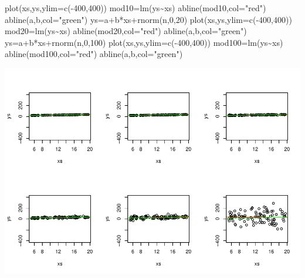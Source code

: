 \documentclass[
]{book}
\newenvironment{Shaded}{\begin{snugshade}}{\end{snugshade}}
\newcommand{\AttributeTok}[1]{\textcolor[rgb]{0.77,0.63,0.00}{#1}}
\newcommand{\DecValTok}[1]{\textcolor[rgb]{0.00,0.00,0.81}{#1}}
\newcommand{\FunctionTok}[1]{\textcolor[rgb]{0.00,0.00,0.00}{#1}}
\newcommand{\NormalTok}[1]{#1}
\newcommand{\OtherTok}[1]{\textcolor[rgb]{0.56,0.35,0.01}{#1}}
\newcommand{\SpecialCharTok}[1]{\textcolor[rgb]{0.00,0.00,0.00}{#1}}
\newcommand{\StringTok}[1]{\textcolor[rgb]{0.31,0.60,0.02}{#1}}
\begin{document}
\begin{Shaded}
\begin{Highlighting}[]
\FunctionTok{plot}\NormalTok{(xs,ys,}\AttributeTok{ylim=}\FunctionTok{c}\NormalTok{(}\SpecialCharTok{{-}}\DecValTok{400}\NormalTok{,}\DecValTok{400}\NormalTok{))}
\NormalTok{mod10}\OtherTok{=}\FunctionTok{lm}\NormalTok{(ys}\SpecialCharTok{\textasciitilde{}}\NormalTok{xs)}
\FunctionTok{abline}\NormalTok{(mod10,}\AttributeTok{col=}\StringTok{"red"}\NormalTok{)}
\FunctionTok{abline}\NormalTok{(a,b,}\AttributeTok{col=}\StringTok{"green"}\NormalTok{)}
\NormalTok{ys}\OtherTok{=}\NormalTok{a}\SpecialCharTok{+}\NormalTok{b}\SpecialCharTok{*}\NormalTok{xs}\SpecialCharTok{+}\FunctionTok{rnorm}\NormalTok{(n,}\DecValTok{0}\NormalTok{,}\DecValTok{20}\NormalTok{)}
\FunctionTok{plot}\NormalTok{(xs,ys,}\AttributeTok{ylim=}\FunctionTok{c}\NormalTok{(}\SpecialCharTok{{-}}\DecValTok{400}\NormalTok{,}\DecValTok{400}\NormalTok{))}
\NormalTok{mod20}\OtherTok{=}\FunctionTok{lm}\NormalTok{(ys}\SpecialCharTok{\textasciitilde{}}\NormalTok{xs)}
\FunctionTok{abline}\NormalTok{(mod20,}\AttributeTok{col=}\StringTok{"red"}\NormalTok{)}
\FunctionTok{abline}\NormalTok{(a,b,}\AttributeTok{col=}\StringTok{"green"}\NormalTok{)}
\NormalTok{ys}\OtherTok{=}\NormalTok{a}\SpecialCharTok{+}\NormalTok{b}\SpecialCharTok{*}\NormalTok{xs}\SpecialCharTok{+}\FunctionTok{rnorm}\NormalTok{(n,}\DecValTok{0}\NormalTok{,}\DecValTok{100}\NormalTok{)}
\FunctionTok{plot}\NormalTok{(xs,ys,}\AttributeTok{ylim=}\FunctionTok{c}\NormalTok{(}\SpecialCharTok{{-}}\DecValTok{400}\NormalTok{,}\DecValTok{400}\NormalTok{))}
\NormalTok{mod100}\OtherTok{=}\FunctionTok{lm}\NormalTok{(ys}\SpecialCharTok{\textasciitilde{}}\NormalTok{xs)}
\FunctionTok{abline}\NormalTok{(mod100,}\AttributeTok{col=}\StringTok{"red"}\NormalTok{)}
\FunctionTok{abline}\NormalTok{(a,b,}\AttributeTok{col=}\StringTok{"green"}\NormalTok{)}
\end{Highlighting}
\end{Shaded}

\includegraphics{ECOMODbook_files/figure-latex/a6.28-1.pdf}
\end{document}
